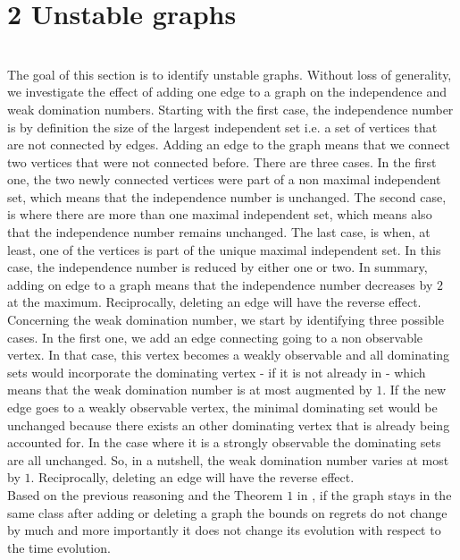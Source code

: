 \documentclass{article} %
\begin{document}
\section*{2 Unstable graphs}
~\\
The goal of this section is to identify unstable graphs. Without loss of generality, we investigate the effect of adding one edge to a graph on the independence and weak domination numbers. Starting with the first case, the independence number is by definition the size of the largest independent set i.e. a set of vertices that are not connected by edges. Adding an edge to the graph means that we connect two vertices that were not connected before. There are three cases. In the first one, the two newly connected vertices were part of a non maximal independent set, which means that the independence number is unchanged. The second case, is where there are more than one maximal independent set, which means also that the independence number remains unchanged. The last case, is when, at least, one of the vertices is part of the unique maximal independent set. In this case, the independence number is reduced by either one or two. In summary, adding on edge to a graph means that the independence number decreases by $2$ at the maximum. Reciprocally, deleting an edge will have the reverse effect.\\

Concerning the weak domination number, we start by identifying three possible cases. In the first one, we add an edge connecting going to a non observable vertex. In that case, this vertex becomes a weakly observable and all dominating sets would incorporate the dominating vertex - if it is not already in - which means that the weak domination number is at most augmented by $1$. If the new edge goes to a weakly observable vertex, the minimal dominating set would be unchanged because there exists an other dominating vertex that is already being accounted for. In the case where it is a strongly observable the dominating sets are all unchanged. So, in a nutshell, the weak domination number varies at most by $1$. Reciprocally, deleting an edge will have the reverse effect.\\

Based on the previous reasoning and the Theorem $1$ in \cite{journals/corr/AlonCDK15}, if the graph stays in the same class after adding or deleting a graph the bounds on regrets do not change by much and more importantly it does not change its evolution with respect to the time evolution.\\
\end{document}
